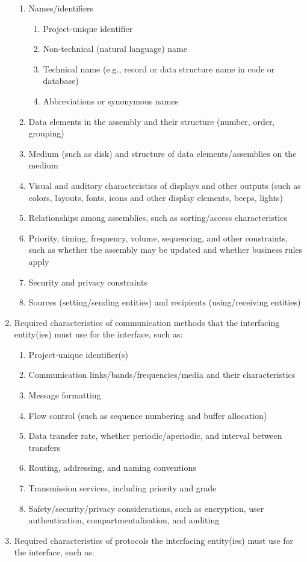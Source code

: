 \documentclass{fidata-report-template}
\begin{document}
\begin{enumerate}
  \begin{enumerate}
  \itemsep1pt\parskip0pt
  \item
    Names/identifiers

    \begin{enumerate}
    \itemsep1pt\parskip0pt
    \item
      Project-unique identifier
    \item
      Non-technical (natural language) name
    \item
      Technical name (e.g., record or data structure name in code or
      database)
    \item
      Abbreviations or synonymous names
    \end{enumerate}
  \item
    Data elements in the assembly and their structure (number, order,
    grouping)
  \item
    Medium (such as disk) and structure of data elements/assemblies on
    the medium
  \item
    Visual and auditory characteristics of displays and other outputs
    (such as colors, layouts, fonts, icons and other display elements,
    beeps, lights)
  \item
    Relationships among assemblies, such as sorting/access
    characteristics
  \item
    Priority, timing, frequency, volume, sequencing, and other
    constraints, such as whether the assembly may be updated and whether
    business rules apply
  \item
    Security and privacy constraints
  \item
    Sources (setting/sending entities) and recipients (using/receiving
    entities)
  \end{enumerate}
\item
  Required characteristics of communication methods that the interfacing
  entity(ies) must use for the interface, such as:

  \begin{enumerate}
  \itemsep1pt\parskip0pt
  \item
    Project-unique identifier(s)
  \item
    Communication links/bands/frequencies/media and their
    characteristics
  \item
    Message formatting
  \item
    Flow control (such as sequence numbering and buffer allocation)
  \item
    Data transfer rate, whether periodic/aperiodic, and interval between
    transfers
  \item
    Routing, addressing, and naming conventions
  \item
    Transmission services, including priority and grade
  \item
    Safety/security/privacy considerations, such as encryption, user
    authentication, compartmentalization, and auditing
  \end{enumerate}
\item
  Required characteristics of protocols the interfacing entity(ies) must
  use for the interface, such as:


\end{enumerate}
\end{document}
